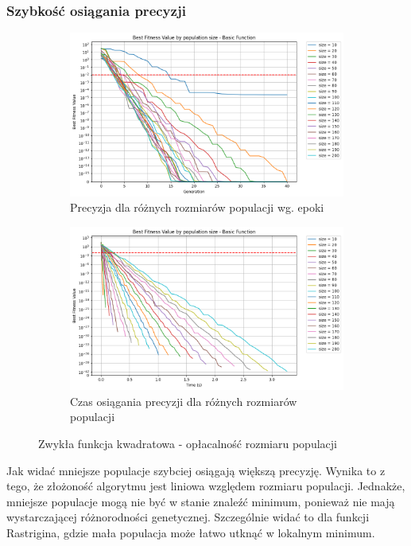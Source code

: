 \documentclass{article}
\begin{document}
\subsubsection*{Szybkość osiągania precyzji}
\begin{figure}[H]
    \centering
    \begin{subfigure}{0.45\textwidth}
        \includegraphics[width=\linewidth]{img/ae1/size_precision.png}
        \caption{Precyzja dla różnych rozmiarów populacji wg. epoki}
    \end{subfigure}
    \hfill
    \begin{subfigure}{0.45\textwidth}
        \includegraphics[width=\linewidth]{img/ae1/size_time.png}
        \caption{Czas osiągania precyzji dla różnych rozmiarów populacji}
    \end{subfigure}
    \caption{Zwykła funkcja kwadratowa - opłacalność rozmiaru populacji}
\end{figure}
Jak widać mniejsze populacje szybciej osiągają większą precyzję. Wynika to z tego, że złożoność algorytmu jest liniowa względem rozmiaru populacji. Jednakże, mniejsze populacje mogą nie być w stanie znaleźć minimum, ponieważ nie mają wystarczającej różnorodności genetycznej. Szczególnie widać to dla funkcji Rastrigina, gdzie mała populacja może łatwo utknąć w lokalnym minimum.
\end{document}
